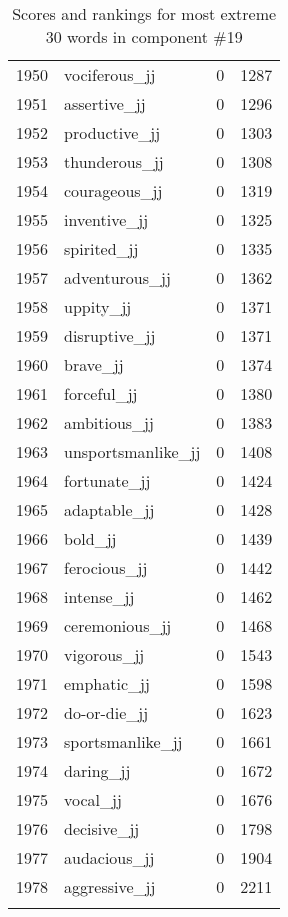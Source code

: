 \begin{longtable}[!htbp]{| rlr@{.}l |}
    1950 & vociferous\_jj & 0 & 1287 \\
    1951 & assertive\_jj & 0 & 1296 \\
    1952 & productive\_jj & 0 & 1303 \\
    1953 & thunderous\_jj & 0 & 1308 \\
    1954 & courageous\_jj & 0 & 1319 \\
    1955 & inventive\_jj & 0 & 1325 \\
    1956 & spirited\_jj & 0 & 1335 \\
    1957 & adventurous\_jj & 0 & 1362 \\
    1958 & uppity\_jj & 0 & 1371 \\
    1959 & disruptive\_jj & 0 & 1371 \\
    1960 & brave\_jj & 0 & 1374 \\
    1961 & forceful\_jj & 0 & 1380 \\
    1962 & ambitious\_jj & 0 & 1383 \\
    1963 & unsportsmanlike\_jj & 0 & 1408 \\
    1964 & fortunate\_jj & 0 & 1424 \\
    1965 & adaptable\_jj & 0 & 1428 \\
    1966 & bold\_jj & 0 & 1439 \\
    1967 & ferocious\_jj & 0 & 1442 \\
    1968 & intense\_jj & 0 & 1462 \\
    1969 & ceremonious\_jj & 0 & 1468 \\
    1970 & vigorous\_jj & 0 & 1543 \\
    1971 & emphatic\_jj & 0 & 1598 \\
    1972 & do-or-die\_jj & 0 & 1623 \\
    1973 & sportsmanlike\_jj & 0 & 1661 \\
    1974 & daring\_jj & 0 & 1672 \\
    1975 & vocal\_jj & 0 & 1676 \\
    1976 & decisive\_jj & 0 & 1798 \\
    1977 & audacious\_jj & 0 & 1904 \\
    1978 & aggressive\_jj & 0 & 2211 \\
    \hline
    \caption{Scores and rankings for most extreme 30 words in component \#19} \\
\end{longtable}
